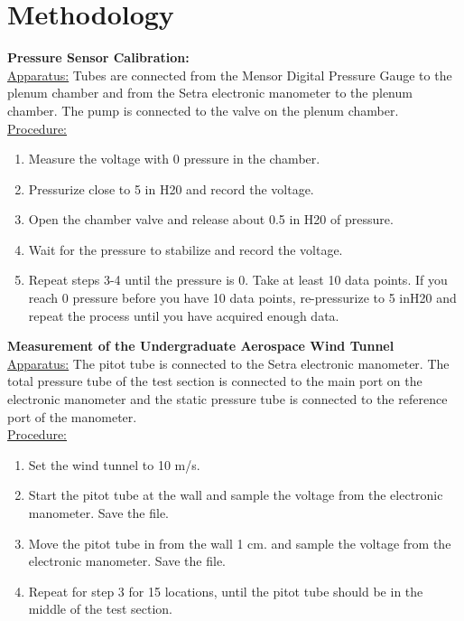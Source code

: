 \chapter{Methodology}
\label{cp:methodology}

\textbf{Pressure Sensor Calibration:} \\
\underline{Apparatus:} Tubes are connected from the Mensor Digital Pressure Gauge to the plenum chamber and from the Setra electronic manometer to the plenum chamber. The pump is connected to the valve on the plenum chamber. \\
\underline{Procedure:} 
\begin{enumerate}
    \item Measure the voltage with 0 pressure in the chamber. 
    \item Pressurize close to 5 in H20 and record the voltage. 
    \item Open the chamber valve and release about 0.5 in H20 of pressure.  
    \item Wait for the pressure to stabilize and record the voltage.  
    \item Repeat steps 3-4 until the pressure is 0. Take at least 10 data points. If you reach 0 pressure before you have 10 data points, re-pressurize to 5 inH20 and repeat the process until you have acquired enough data.
\end{enumerate}
\noindent\textbf{Measurement of the Undergraduate Aerospace Wind Tunnel}\\
\underline{Apparatus:} The pitot tube is connected to the Setra electronic manometer. The total pressure tube of the test section is connected to the main port on the electronic manometer and the static pressure tube is connected to the reference port of the manometer. \\
\underline{Procedure:}
\begin{enumerate}
    \item Set the wind tunnel to 10 m/s. 
    \item Start the pitot tube at the wall and sample the voltage from the electronic manometer. Save the file. 
    \item Move the pitot tube in from the wall 1 cm. and sample the voltage from the electronic manometer. Save the file.  
    \item Repeat for step 3 for 15 locations, until the pitot tube should be in the middle of the test section.
\end{enumerate}